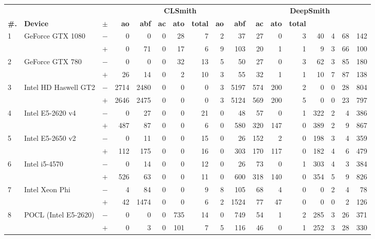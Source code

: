   \begin{tabular}{lll | rrrrrrr | rrrrrrr }
  \toprule
  & & & \multicolumn{7}{c|}{\textbf{CLSmith}} & \multicolumn{7}{c}{\textbf{DeepSmith}} \\
  \textbf{\#.} & \textbf{Device} & $\pm$ &
  \textbf{ao} & \textbf{abf} & \textbf{ac} & \textbf{ato} & \textbf{total} &
  \textbf{ao} & \textbf{abf} & \textbf{ac} & \textbf{ato} & \textbf{total} \\
  \midrule
  \multirow{ 2}{*}{1} & \multirow{ 2}{*}{GeForce GTX 1080} & $-$ & 0 & 0 & 0 & 28 & 7 & 2 & 37       & 27 & 0 & 3 & 40 & 4 & 68 & 142 \\& & $+$ & 0 & 71 & 0 & 17 & 6 & 9 & 103 & 20 & 1 & 1 & 9 & 3 & 66 & 100 \\
\hline
\multirow{ 2}{*}{2} & \multirow{ 2}{*}{GeForce GTX 780} & $-$ & 0 & 0 & 0 & 32 & 13 & 5 & 50       & 27 & 0 & 3 & 62 & 3 & 85 & 180 \\& & $+$ & 26 & 14 & 0 & 2 & 10 & 3 & 55 & 32 & 1 & 1 & 10 & 7 & 87 & 138 \\
\hline
\multirow{ 2}{*}{3} & \multirow{ 2}{*}{Intel HD Haswell GT2} & $-$ & 2714 & 2480 & 0 & 0 & 0 & 3 & 5197       & 574 & 200 & 2 & 0 & 0 & 28 & 804 \\& & $+$ & 2646 & 2475 & 0 & 0 & 0 & 3 & 5124 & 569 & 200 & 5 & 0 & 0 & 23 & 797 \\
\hline
\multirow{ 2}{*}{4} & \multirow{ 2}{*}{Intel E5-2620 v4} & $-$ & 0 & 27 & 0 & 0 & 21 & 0 & 48       & 57 & 0 & 1 & 322 & 2 & 4 & 386 \\& & $+$ & 487 & 87 & 0 & 0 & 6 & 0 & 580 & 320 & 147 & 0 & 389 & 2 & 9 & 867 \\
\hline
\multirow{ 2}{*}{5} & \multirow{ 2}{*}{Intel E5-2650 v2} & $-$ & 0 & 11 & 0 & 0 & 15 & 0 & 26       & 152 & 2 & 0 & 198 & 3 & 4 & 359 \\& & $+$ & 112 & 175 & 0 & 0 & 16 & 0 & 303 & 170 & 117 & 0 & 182 & 4 & 6 & 479 \\
\hline
\multirow{ 2}{*}{6} & \multirow{ 2}{*}{Intel i5-4570} & $-$ & 0 & 14 & 0 & 0 & 12 & 0 & 26       & 73 & 0 & 1 & 303 & 4 & 3 & 384 \\& & $+$ & 526 & 63 & 0 & 0 & 11 & 0 & 600 & 318 & 140 & 0 & 354 & 5 & 9 & 826 \\
\hline
\multirow{ 2}{*}{7} & \multirow{ 2}{*}{Intel Xeon Phi} & $-$ & 4 & 84 & 0 & 0 & 9 & 8 & 105       & 68 & 4 & 0 & 0 & 2 & 4 & 78 \\& & $+$ & 42 & 1474 & 0 & 0 & 6 & 2 & 1524 & 77 & 47 & 0 & 0 & 0 & 2 & 126 \\
\hline
\multirow{ 2}{*}{8} & \multirow{ 2}{*}{POCL (Intel E5-2620)} & $-$ & 0 & 0 & 0 & 735 & 14 & 0 & 749       & 54 & 1 & 2 & 285 & 3 & 26 & 371 \\& & $+$ & 0 & 3 & 0 & 101 & 7 & 5 & 116 & 46 & 0 & 1 & 252 & 3 & 28 & 330 \\

\end{tabular}
